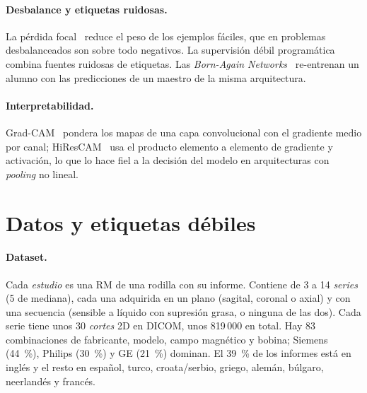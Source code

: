 \documentclass{article}
\begin{document}
\paragraph{Desbalance y etiquetas ruidosas.} La pérdida focal~\cite{lin2017focal} reduce el peso de los ejemplos fáciles, que en problemas desbalanceados son sobre todo negativos. La supervisión débil programática~\cite{ratner2017snorkel} combina fuentes ruidosas de etiquetas. Las \emph{Born-Again Networks}~\cite{furlanello2018born} re-entrenan un alumno con las predicciones de un maestro de la misma arquitectura.

\paragraph{Interpretabilidad.} Grad-CAM~\cite{selvaraju2017gradcam} pondera los mapas de una capa convolucional con el gradiente medio por canal; HiResCAM~\cite{draelos2020hirescam} usa el producto elemento a elemento de gradiente y activación, lo que lo hace fiel a la decisión del modelo en arquitecturas con \emph{pooling} no lineal.

\section{Datos y etiquetas débiles}

\paragraph{Dataset.} Cada \emph{estudio} es una RM de una rodilla con su informe. Contiene de 3 a 14 \emph{series} (5 de mediana), cada una adquirida en un plano (sagital, coronal o axial) y con una secuencia (sensible a líquido con supresión grasa, o ninguna de las dos). Cada serie tiene unos 30 \emph{cortes} 2D en DICOM, unos 819\,000 en total. Hay 83 combinaciones de fabricante, modelo, campo magnético y bobina; Siemens (44~\%), Philips (30~\%) y GE (21~\%) dominan. El 39~\% de los informes está en inglés y el resto en español, turco, croata/serbio, griego, alemán, búlgaro, neerlandés y francés.
\end{document}
